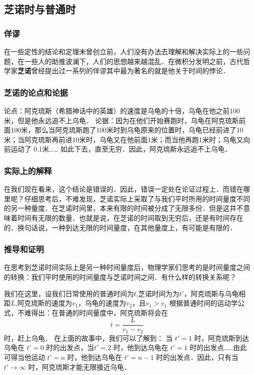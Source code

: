 
\begin{issues}
\issueTODO
\end{issues}

\subsection{芝诺时与普通时}

\subsubsection{佯谬}
在一些定性的结论和定理未曾创立前，人们没有办法去理解和解决实际上的一些问题，在一些人的助推波澜下，人们的思想越来越混乱．在微积分发明之前，古代哲学家\textbf{芝诺}曾经提出过一系列的佯谬其中最为著名的就是他关于时间的悖论．

\subsubsection{芝诺的论点和论据}
论点：阿克琉斯（希腊神话中的英雄）的速度是乌龟的十倍，乌龟在他之前100米，但是他永远追不上乌龟．
论据：因为在他们开始赛跑时，乌龟在阿克琉斯前面100米，那么当阿克琉斯跑了100米时到乌龟原来的位置时，乌龟已经前进了10米；当阿克琉斯再前进10米时，乌龟又在他前面1米；而当他再跑1米时；乌龟又向前运动了  0.1米…… 如此下去，直至无穷．因此，阿克琉斯永远追不上乌龟．

\subsubsection{实际上的解释}
在我们现在看来，这个结论是错误的．因此，错误一定处在论证过程上．而错在哪里呢？仔细思考后，不难发现，芝诺实际上采取了与我们平时所用的时间量度不同的另一种量度．在芝诺时间里，本来有限的时间被分成了无限多份．但是这并不意味着时间有无限的数量．也就是说，在芝诺的时间取到无穷后，还是有时间存在的．换句话说，一种到达无限的时间量度，在其他量度上，有可能是有限的．

\subsubsection{推导和证明}
在思考到芝诺时间实际上是另一种时间量度后，物理学家们思考的是时间量度之间的转换：我们平时使用的时间量度与芝诺时间之间．有什么样的转换关系呢？

我们在这里，设我们日常使用的普通时间为$t$,芝诺时间为为$t'$，阿克琉斯与乌龟相距$L$,阿克琉斯的速度为$v_1$，乌龟的速度为$v_2$，且$v_1>v_1$
根据普通时间的运动学公式，不难得出：在普通的时间量度中，阿克琉斯将会在
\begin{equation}
t = \dfrac{L}{v_1 - v_2}
\end{equation}
时，赶上乌龟．
在上面的故事中，我们可以了解到：
当 $t'=1$ 时，阿克琉斯到达乌龟在 $t'=0$ 时的出发点，当$t'=2$ 时，他到达乌龟在 $t'=1$ 时的出发点……由此可得当他运动 $t'=n$ 时，他到达乌龟在 $t'=n-1$ 时的出发点．因此，只有当 $t'\to\infty$ 时，阿克琉斯才能无限接近乌龟．